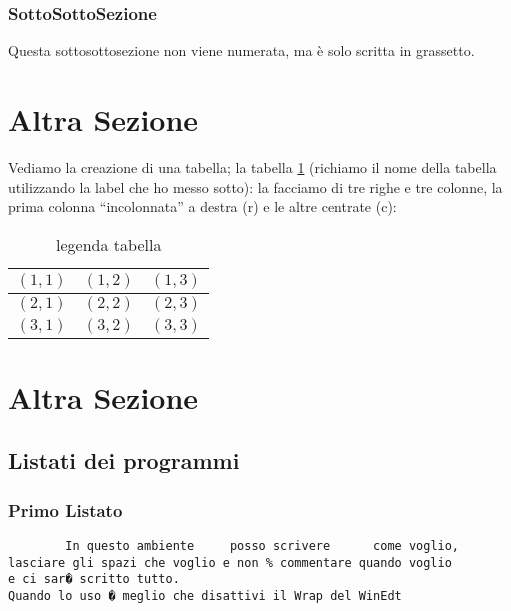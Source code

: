 \documentclass[12pt,a4paper,openright,twoside]{report}
\begin{document}
\subsubsection{SottoSottoSezione}Questa sottosottosezione non viene
numerata, ma \`e solo scritta in grassetto.
\section{Altra Sezione}                 %
Vediamo la creazione di una tabella; la tabella \ref{tab:uno}
(richiamo il nome della tabella utilizzando la label che ho messo sotto):
la facciamo di tre righe e tre colonne, la prima colonna
``incolonnata'' a destra (r) e le altre centrate (c):\\
\begin{table}[h]                        %
\begin{center}                          %
\begin{tabular}{r|c|c}                  %
\hline \hline                           %
$(1,1)$ & $(1,2)$ & $(1,3)$\\           %
\hline                                  %
$(2,1)$ & $(2,2)$ & $(2,3)$\\           %
\hline                                  %
$(3,1)$ & $(3,2)$ & $(3,3)$\\
\hline \hline                           %
\end{tabular}
\caption[legenda elenco tabelle]{legenda tabella}\label{tab:uno}
\end{center}
\end{table}
\section{Altra Sezione}\label{sec:prova}%
\subsection{Listati dei programmi}
\subsubsection{Primo Listato}
\begin{verbatim}
        In questo ambiente     posso scrivere      come voglio,
lasciare gli spazi che voglio e non % commentare quando voglio
e ci sar� scritto tutto.
Quando lo uso � meglio che disattivi il Wrap del WinEdt
\end{verbatim}
\clearpage{\pagestyle{empty}\cleardoublepage}
\end{document}
